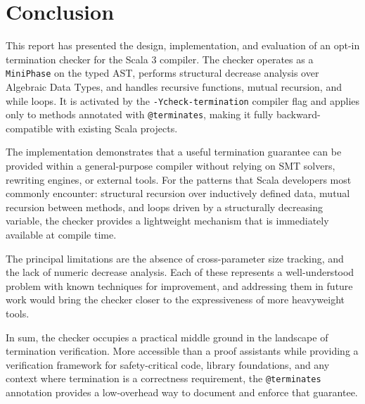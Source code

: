 \chapter{Conclusion}

This report has presented the design, implementation, and evaluation of an
opt-in termination checker for the Scala 3 compiler. The checker operates as a
\texttt{MiniPhase} on the typed AST, performs structural decrease analysis over
Algebraic Data Types, and handles recursive functions, mutual recursion, and
while loops. It is activated by the \texttt{-Ycheck-termination} compiler flag
and applies only to methods annotated with \texttt{@terminates}, making it fully
backward-compatible with existing Scala projects.

The implementation demonstrates that a useful termination guarantee can be
provided within a general-purpose compiler without relying on SMT solvers,
rewriting engines, or external tools. For the patterns that Scala developers
most commonly encounter: structural recursion over inductively defined data,
mutual recursion between methods, and loops driven by a structurally decreasing
variable, the checker provides a lightweight mechanism that is immediately
available at compile time.

The principal limitations are the absence of cross-parameter size tracking, and
the lack of numeric decrease analysis. Each of these represents a
well-understood problem with known techniques for improvement, and addressing
them in future work would bring the checker closer to the expressiveness of more
heavyweight tools.

In sum, the checker occupies a practical middle ground in the landscape of
termination verification. More accessible than a proof assistants while
providing a verification framework for safety-critical code, library
foundations, and any context where termination is a correctness requirement, the
\texttt{@terminates} annotation provides a low-overhead way to document and
enforce that guarantee.

